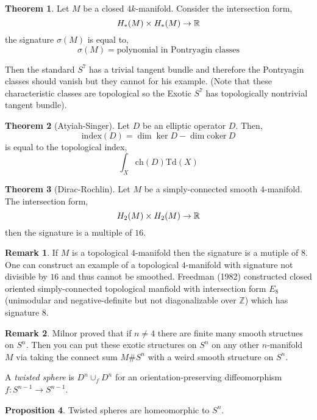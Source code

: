 \documentclass[12pt]{extarticle}
\newcommand{\Z}{\mathbb{Z}}
\newcommand{\coker}[1]{\mathrm{coker}\: #1}
\theoremstyle{definition}
\newtheorem{theorem}{Theorem}[section]
\newtheorem{proposition}[theorem]{Proposition}
\newtheorem{remark}{Remark}
\newenvironment{definition}[1][Definition:]{\begin{trivlist}
\item[\hskip \labelsep {\bfseries #1}]}{\end{trivlist}}
\begin{document}
\begin{theorem}
Let $M$ be a closed $4k$-manifold. Consider the intersection form,
\[ H_*(M) \times H_*(M) \to \mathbb{R} \]
the signature $\sigma(M)$ is equal to,
\[ \sigma(M) = \text{polynomial in Pontryagin classes} \]
\end{theorem}

Then the standard $S^7$ has a trivial tangent bundle and therefore the Pontryagin classes should vanish but they cannot for his example. (Note that these characteristic classes are topological so the Exotic $S^7$ has topologically nontrivial tangent bundle).

\begin{theorem}[Atyiah-Singer]
Let $D$ be an elliptic operator $D$. Then,
\[ \text{index}(D) = \dim{\ker{D}} - \dim{\coker{D}} \] 
is equal to the topological index,
\[ \int_X \mathrm{ch}(D) \mathrm{Td}(X) \]
\end{theorem}

\begin{theorem}[Dirac-Rochlin]
Let $M$ be a simply-connected smooth $4$-manifold. The intersection form,
\[ H_2(M) \times H_2(M) \to \mathbb{R} \]
then the signature is a multiple of $16$. 
\end{theorem}

\begin{remark}
If $M$ is a topological $4$-manifold then the signature is a mutiple of $8$. One can construct an example of a topological $4$-manifold with signature not divisible by $16$ and thus cannot be smoothed. Freedman (1982) constructed closed oriented simply-connected topological manfiold with intersection form $E_8$ (unimodular and negative-definite but not diagonalizable over $\Z$) which has signature $8$. 
\end{remark}

\begin{remark}
Milnor proved that if $n \neq 4$ there are finite many smooth structues on $S^n$. Then you can put these exotic structures on $S^n$ on any other $n$-manifold $M$ via taking the connect sum $M \# S^n$ with a weird smooth structure on $S^n$.
\end{remark}

\begin{definition}
A \textit{twisted sphere} is $D^n \cup_f D^n$ for an orientation-preserving diffeomorphism $f : S^{n-1} \to S^{n-1}$. 
\end{definition}

\begin{proposition}
Twisted spheres are homeomorphic to $S^n$.
\end{proposition}
\end{document}
